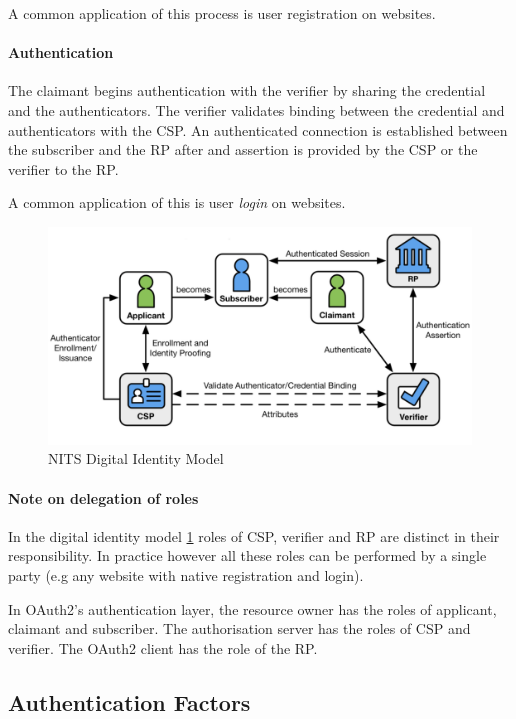 A common application of this process is user registration on websites.

\paragraph{Authentication}

The claimant begins authentication with the verifier by sharing the credential and the authenticators. The verifier validates binding between the credential and authenticators with the CSP.
An authenticated connection is established between the subscriber and the RP after and assertion is provided by the CSP or the verifier to the RP.

A common application of this is user \textit{login} on websites.


\begin{figure}[h!]
	\centering
	\includegraphics[width=13cm]{images/NIST_digital_identity_model}
	\caption{NITS Digital Identity Model}
	\label{fig:NIST-digital-identity-model}
\end{figure}

\paragraph{Note on delegation of roles}
In the digital identity model \ref{fig:NIST-digital-identity-model} roles of CSP, verifier and RP are distinct in their responsibility. 
In practice however all these roles can be performed by a single party (e.g any website with native registration and login).

In OAuth2's \cite{hardt2012oauth} authentication layer, the resource owner has the roles of applicant, claimant and subscriber. The authorisation server has the roles of CSP and verifier. The OAuth2 client has the role of the RP.

\subsection{Authentication Factors}

